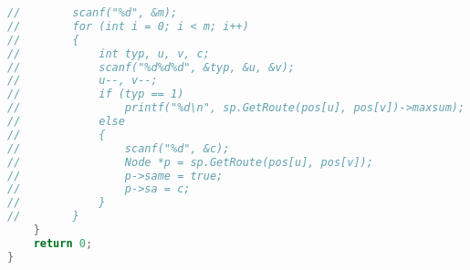 \begin{lstlisting}[language=c++]
//        scanf("%d", &m);
//        for (int i = 0; i < m; i++)
//        {
//            int typ, u, v, c;
//            scanf("%d%d%d", &typ, &u, &v);
//            u--, v--;
//            if (typ == 1)
//                printf("%d\n", sp.GetRoute(pos[u], pos[v])->maxsum);
//            else
//            {
//                scanf("%d", &c);
//                Node *p = sp.GetRoute(pos[u], pos[v]);
//                p->same = true;
//                p->sa = c;
//            }
//        }
    }
    return 0;
}
        \end{lstlisting}